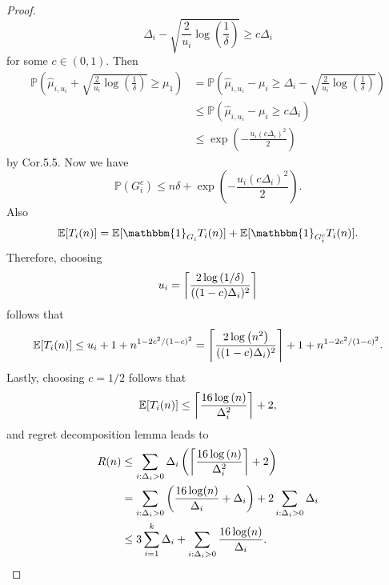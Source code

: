 \documentclass[10pt]{article}
\theoremstyle{definition}
\DeclarePairedDelimiter{\ceil}{\lceil}{\rceil}
\begin{document}
\begin{proof}
    \begin{equation*}
        \Delta_i - \sqrt{\frac{2}{u_i}\log\left(\frac{1}{\delta}\right)} \geq c\Delta_i
    \end{equation*}
    for some $c \in (0, 1)$.
    Then
    \begin{align*}
        \mathbb{P}\left( \hat{\mu}_{i, u_i} + \sqrt{\frac{2}{u_i}\log\left(\frac{1}{\delta}\right)} \geq \mu_1 \right) 
        &= \mathbb{P}\left( \hat{\mu}_{i, u_i} - \mu_i \geq \Delta_i - \sqrt{\frac{2}{u_i}\log\left(\frac{1}{\delta}\right)} \right) \\
        &\leq \mathbb{P}\left( \hat{\mu}_{i, u_i} - \mu_i \geq c \Delta_i \right) \\
        &\leq \exp\left(-\frac{u_i (c \Delta_i)^2}{2}\right)
    \end{align*}
    by Cor.5.5.
    Now we have
    \begin{equation*}
        \mathbb{P}(G_i^c) \leq n \delta + \exp\left(-\frac{u_i (c \Delta_i)^2}{2}\right).
    \end{equation*}
    Also
    \begin{equation*}
        \mathbb{E}[T_i (n)] = \mathbb{E}[\mathbbm{1}_{G_i}T_i(n)]+ \mathbb{E}[\mathbbm{1}_{G_i^c}T_i(n)].
    \end{equation*}
    Therefore, choosing 
    \begin{equation*}
        u_i = \ceil*{\frac{2\log\left(1/\delta\right)}{((1-c) \Delta_i)^2}}
    \end{equation*}
    follows that
    \begin{equation*}
        \mathbb{E}[T_i(n)] \leq u_i + 1 + n^{1-2c^2/(1-c)^2} = \ceil*{\frac{2\log\left(n^2\right)}{((1-c) \Delta_i)^2}} + 1 + n^{1-2c^2/(1-c)^2}.
    \end{equation*}
    Lastly, choosing $c=1/2$ follows that
    \begin{equation*}
        \mathbb{E}[T_i(n)] \leq \ceil*{\frac{16\log\left(n\right)}{\Delta_i^2}} + 2,
    \end{equation*}
    and regret decomposition lemma leads to 
    \begin{align*}
        R(n) &\leq \sum_{i: \Delta_i > 0} \Delta_i \left( \ceil*{\frac{16\log\left(n\right)}{\Delta_i^2}} + 2 \right) \\
        &= \sum_{i: \Delta_i > 0} \left(\frac{16 \log (n)}{\Delta_i}+\Delta_i\right) + 2 \sum_{i: \Delta_i > 0} \Delta_i \\
        &\leq 3 \sum_{i=1}^k \Delta_i + \sum_{i: \Delta_i > 0} \frac{16 \log (n)}{\Delta_i}.
    \end{align*}
\end{proof}
\end{document}
